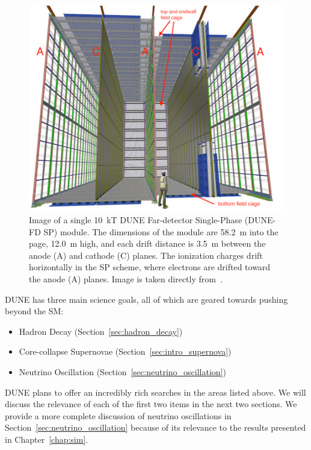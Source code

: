 \begin{figure}[]
\centering
\includegraphics[width=\textwidth]{images/dune_fd_10ktmodule_tdrv1.png}
\caption{Image of a single 10~\unit{kT} DUNE Far-detector Single-Phase (DUNE-FD SP) module.
The dimensions of the module are 58.2~\unit{m} into the page, 12.0~\unit{m} high, and each drift distance is 3.5~\unit{m} between the anode (A) and cathode (C) planes. 
The ionization charges drift horizontally in the SP scheme, where electrons are drifted toward the anode (A) planes.
Image is taken directly from~\citep{DUNE_TDR_V1_Abi_2020}.
}
\label{fig:dune_10kt}
\end{figure}


DUNE has three main science goals, all of which are geared towards pushing beyond the SM:
\begin{itemize}
    \item Hadron Decay (Section~\ref{sec:hadron_decay})
    \item Core-collapse Supernovae (Section~\ref{sec:intro_supernova})
    \item Neutrino Oscillation (Section~\ref{sec:neutrino_oscillation})
\label{item:dune_props}
\end{itemize}

DUNE plans to offer an incredibly rich searches in the areas listed above.
We will discuss the relevance of each of the first two items in the next two sections.
We provide a more complete discussion of neutrino oscillations in Section~\ref{sec:neutrino_oscillation} because of its relevance to the results presented in Chapter~\ref{chap:sim}.


